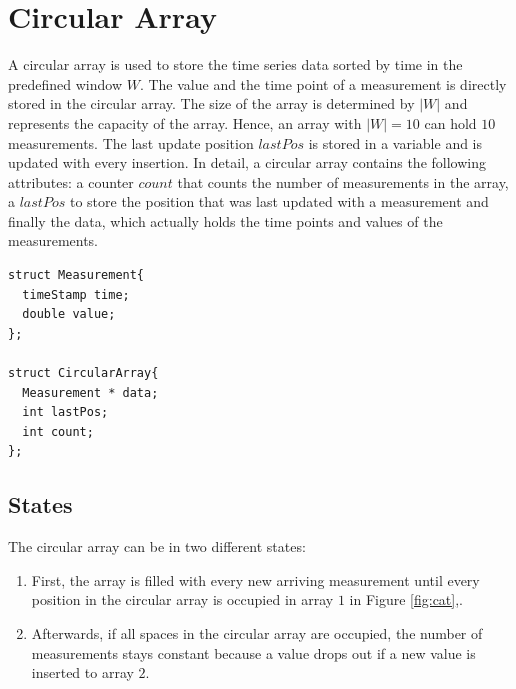 \documentclass[abstracton,12pt,oneside]{scrreprt}
\begin{document}
\section{Circular Array}
\label{sec:circularArray}
A circular array is used to store the time series data sorted by time in the predefined window $W$. The value and the time point of a measurement is directly stored in the circular array. 
The size of the array is determined by $|W|$ and represents the capacity of the array. Hence, an array with $|W|=10$ can hold $10$ measurements. The last update position $lastPos$ is stored in a variable and is updated with every insertion. In detail, a circular array contains the following attributes: a counter $count$ that counts the number of measurements in the array, a $lastPos$ to store the position that was last updated with a measurement and finally the data, which actually holds the time points and values of the measurements.

\lstset{language=C}
\begin{lstlisting}
struct Measurement{
  timeStamp time;
  double value;
};

struct CircularArray{
  Measurement * data;
  int lastPos;
  int count;
};
\end{lstlisting}
\BlankLine

\subsection{States}
The circular array can be in two different states:
\begin{enumerate}  
	\item First, the array is filled with every new arriving measurement until every position in the circular array is occupied in array $1$ in Figure \ref{fig:cat},.  
	\item Afterwards, if all spaces in the circular array are occupied, the number of measurements stays constant because a value drops out if a new value is inserted to array $2$. 
\end{enumerate}
\end{document}
